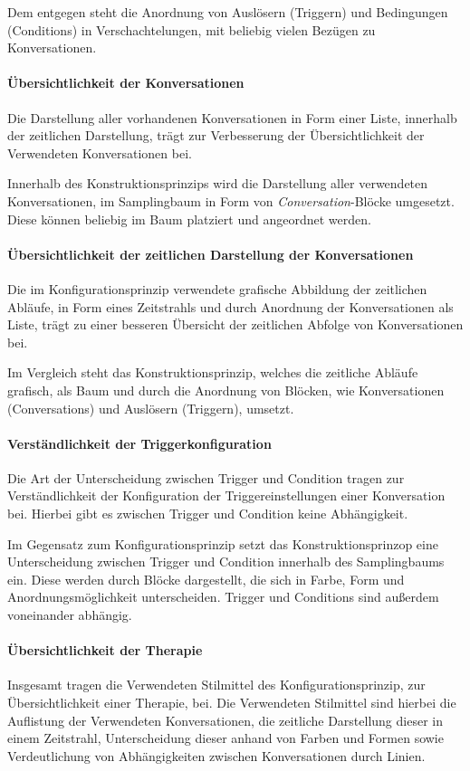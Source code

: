 Dem entgegen steht die Anordnung von Auslösern (Triggern) und Bedingungen (Conditions) in Verschachtelungen, mit beliebig vielen Bezügen zu Konversationen.

\paragraph{Übersichtlichkeit der Konversationen}
Die Darstellung aller vorhandenen Konversationen in Form einer Liste, innerhalb der zeitlichen Darstellung, trägt zur Verbesserung der Übersichtlichkeit der Verwendeten Konversationen bei.

Innerhalb des Konstruktionsprinzips wird die Darstellung aller verwendeten Konversationen, im Samplingbaum in Form von \emph{Conversation}-Blöcke umgesetzt. Diese können beliebig im Baum platziert und angeordnet werden.

\paragraph{Übersichtlichkeit der zeitlichen Darstellung der Konversationen}
Die im Konfigurationsprinzip verwendete grafische Abbildung der zeitlichen Abläufe, in Form eines Zeitstrahls und durch Anordnung der Konversationen als Liste, trägt zu einer besseren Übersicht der zeitlichen Abfolge von Konversationen bei. 

Im Vergleich steht das Konstruktionsprinzip, welches die zeitliche Abläufe grafisch, als Baum und durch die Anordnung von Blöcken, wie Konversationen (Conversations) und Auslösern (Triggern), umsetzt.

\paragraph{Verständlichkeit der Triggerkonfiguration}
Die Art der Unterscheidung zwischen Trigger und Condition tragen zur Verständlichkeit der Konfiguration der Triggereinstellungen einer Konversation bei. Hierbei gibt es zwischen Trigger und Condition keine Abhängigkeit. 

Im Gegensatz zum Konfigurationsprinzip setzt das Konstruktionsprinzop eine Unterscheidung zwischen Trigger und Condition innerhalb des Samplingbaums ein. Diese werden durch Blöcke dargestellt, die sich in Farbe, Form und Anordnungsmöglichkeit unterscheiden. Trigger und Conditions sind außerdem voneinander abhängig.

\paragraph{Übersichtlichkeit der Therapie}
Insgesamt tragen die Verwendeten Stilmittel des Konfigurationsprinzip, zur Übersichtlichkeit einer Therapie, bei. Die Verwendeten Stilmittel sind hierbei die Auflistung der Verwendeten Konversationen, die zeitliche Darstellung dieser in einem Zeitstrahl, Unterscheidung dieser anhand von Farben und Formen sowie Verdeutlichung von Abhängigkeiten zwischen Konversationen durch Linien. 

